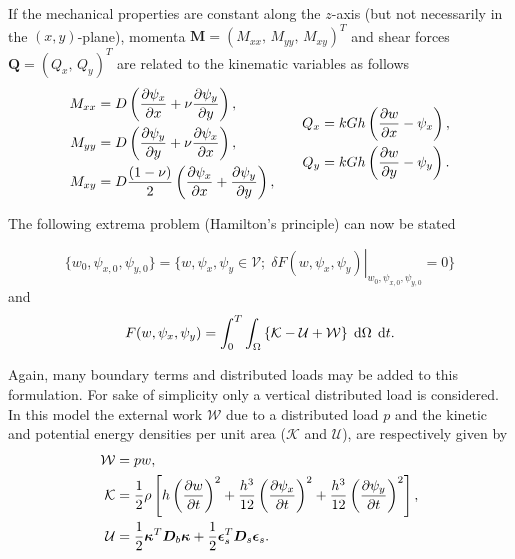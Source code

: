 \documentclass[preprint,12pt]{elsarticle}
\begin{document}
If the mechanical properties are constant along the $z$-axis (but not necessarily in the $(x, y)$-plane), momenta $\bm{M} = \left(M_{xx}, \, M_{yy}, \, M_{xy} \right)^T$ and shear forces $\bm{Q} = \left(Q_{x}, \, Q_{y}\right)^T$ are related to the kinematic variables as follows
\begin{equation}
\begin{aligned}
M_{xx} &= D\left(\diffp{\psi_x}{x} + \nu \diffp{\psi_y}{y}\right),\\
M_{yy} &= D\left(\diffp{\psi_y}{y} + \nu \diffp{\psi_x}{x}\right),\\
M_{xy} &= D \frac{(1 - \nu)}{2} \left(\diffp{\psi_x}{x} + \diffp{\psi_y}{y}\right), \\
\end{aligned} \qquad
\begin{aligned}
Q_{x} &= k G h \left(\diffp{w}{x} - \psi_x \right), \\
Q_{y} &= k G h \left(\diffp{w}{y} - \psi_y \right). \\
\end{aligned}
\end{equation}

The following extrema problem (Hamilton's principle) can now be stated

\begin{equation} 
\{w_0, \psi_{x, 0}, \psi_{y, 0}\} = \{w, \psi_x, \psi_y \in \mathcal V; \; \left.\delta F(w,\psi_x, \psi_y) \right|_{w_0, \psi_{x, 0}, \psi_{y, 0}} = 0\}
\end{equation}
and
\begin{equation}
F(w, \psi_x, \psi_y) = \int_0^T \int_\Omega \left\{\mathcal{K} - \mathcal{U} + \mathcal{W} \right\} \d\Omega \, \d{t}.
\end{equation}

Again, many boundary terms and distributed loads may be added to this formulation. For sake of simplicity only a vertical distributed load is considered. In this model the external work $\mathcal{W}$ due to a distributed load $p$ and the kinetic and potential energy densities per unit area ($\mathcal{K}$ and $\mathcal{U}$), are respectively given by
\begin{align*}
\mathcal{W} &= pw, \\
\mathcal{K} &= \frac{1}{2} \rho \left[ h \left(\diffp{w}{t}\right)^2 +  \frac{h^3}{12}\left(\diffp{\psi_x}{t}\right)^2 + \frac{h^3}{12}\left(\diffp{\psi_y}{t}\right)^2 \right],\\
\mathcal{U} &= \frac{1}{2}\bm{\kappa}^T \bm{D}_b \bm{\kappa} + \frac{1}{2}\bm{\epsilon}_s^T \bm{D}_s \bm{\epsilon}_s.	
\end{align*} 
\end{document}
